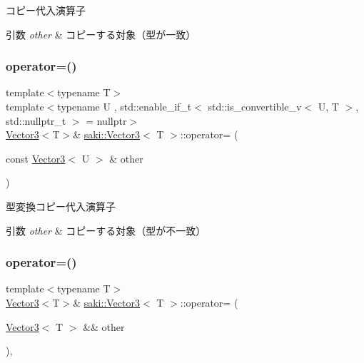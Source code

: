 コピー代入演算子 


\begin{DoxyParams}{引数}
{\em other} & コピーする対象（型が一致） \\
\hline
\end{DoxyParams}
\mbox{\label{classsaki_1_1_vector3_aa2ae3bfecb3dc9c6a8c56c29ae19a588}} 
\subsubsection{\texorpdfstring{operator=()}{operator=()}\hspace{0.1cm}{\footnotesize\ttfamily [2/4]}}
{\footnotesize\ttfamily template$<$typename T$>$ \\
template$<$typename U , std\+::enable\+\_\+if\+\_\+t$<$ std\+::is\+\_\+convertible\+\_\+v$<$ U, T $>$, std\+::nullptr\+\_\+t $>$  = nullptr$>$ \\
\mbox{\hyperlink{classsaki_1_1_vector3}{Vector3}}$<$T$>$\& \mbox{\hyperlink{classsaki_1_1_vector3}{saki\+::\+Vector3}}$<$ T $>$\+::operator= (\begin{DoxyParamCaption}\item[{const \mbox{\hyperlink{classsaki_1_1_vector3}{Vector3}}$<$ U $>$ \&}]{other }\end{DoxyParamCaption})\hspace{0.3cm}{\ttfamily [inline]}}



型変換コピー代入演算子 


\begin{DoxyParams}{引数}
{\em other} & コピーする対象（型が不一致） \\
\hline
\end{DoxyParams}
\mbox{\label{classsaki_1_1_vector3_a970ff174a4c8508b6798011086ed9cb5}} 
\subsubsection{\texorpdfstring{operator=()}{operator=()}\hspace{0.1cm}{\footnotesize\ttfamily [3/4]}}
{\footnotesize\ttfamily template$<$typename T$>$ \\
\mbox{\hyperlink{classsaki_1_1_vector3}{Vector3}}$<$T$>$\& \mbox{\hyperlink{classsaki_1_1_vector3}{saki\+::\+Vector3}}$<$ T $>$\+::operator= (\begin{DoxyParamCaption}\item[{\mbox{\hyperlink{classsaki_1_1_vector3}{Vector3}}$<$ T $>$ \&\&}]{other }\end{DoxyParamCaption})\hspace{0.3cm}{\ttfamily [inline]}, {\ttfamily [noexcept]}}



